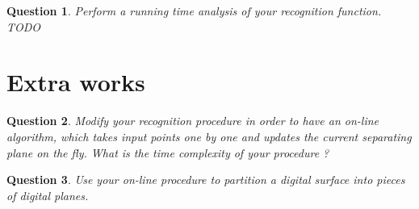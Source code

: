 \documentclass[a4paper, 11pt]{article}
\newtheorem{qu}{Question}
\begin{document}
  



\begin{qu}
  Perform a running time analysis of your recognition function.  
  TODO
\end{qu}	

\section{Extra works}

\begin{qu}
Modify your recognition procedure in order to have an on-line algorithm, 
which takes input points one by one 
 and updates the current separating plane on the fly.
What is the time complexity of your procedure ?
\end{qu}

\begin{qu}
Use your on-line procedure to partition a digital surface into pieces of digital planes. 
\end{qu}
\end{document}
